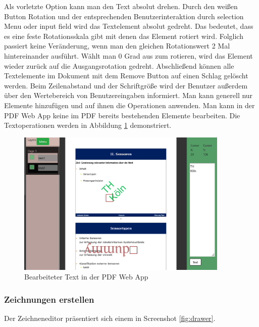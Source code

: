 Als vorletzte Option kann man den Text absolut drehen. Durch den weißen Button Rotation und der entsprechenden Benutzerinteraktion durch selection Menu oder input field wird das Textelement absolut gedreht. Das bedeutet, dass es eine feste Rotationsskala gibt mit denen das Element rotiert wird. Folglich passiert keine Veränderung, wenn man den gleichen Rotationswert 2 Mal hintereinander ausführt. Wählt man 0 Grad aus zum rotieren, wird das Element wieder zurück auf die Ausgangsrotation gedreht. Abschließend können alle Textelemente im Dokument mit dem Remove Button auf einen Schlag gelöscht werden. Beim Zeilenabstand und der Schriftgröße wird der Benutzer außerdem über den Wertebereich von Benutzereingaben informiert. Man kann generell nur Elemente hinzufügen und auf ihnen die Operationen anwenden. Man kann in der PDF Web App keine im PDF bereits bestehenden Elemente bearbeiten. Die Textoperationen werden in Abbildung \ref{fig:text} demonstriert.

\begin{figure}[!htbp]
	\centering
	\includegraphics[width=0.9\textwidth]{"images/text.png"}
	\caption{Bearbeiteter Text in der PDF Web App}
	\label{fig:text}
\end{figure}

\subsubsection{Zeichnungen erstellen}
Der Zeichneneditor präsentiert sich einem in Screenshot \ref{fig:drawer}. 

